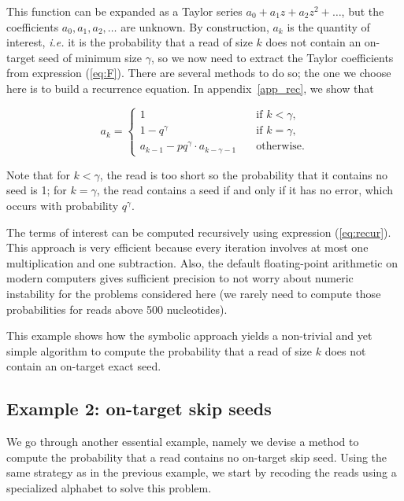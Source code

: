 \documentclass{article}
\begin{document}
This function can be expanded as a Taylor series $a_0 + a_1z + a_2z^2 +
\ldots$, but the coefficients $a_0, a_1, a_2, \ldots$ are unknown. By
construction, $a_k$ is the quantity of interest, \textit{i.e.} it is the
probability that a read of size $k$ does not contain an on-target seed of
minimum size $\gamma$, so we now need to extract the Taylor coefficients
from expression (\ref{eq:F}). There are several methods to do so; the one
we choose here is to build a recurrence equation. In
appendix~\ref{app_rec}, we show that

\begin{equation}
\label{eq:recur}
a_k = 
\begin{cases}
1            &\quad\text{if } k < \gamma, \\
1 -q^\gamma &\quad\text{if } k = \gamma, \\
a_{k-1} -pq^\gamma \cdot a_{k-\gamma-1} &\quad\text{otherwise.}
\end{cases}
\end{equation}

Note that for $k < \gamma$, the read is too short so the probability that
it contains no seed is 1; for $k = \gamma$, the read contains a seed if
and only if it has no error, which occurs with probability $q^\gamma$.

The terms of interest can be computed recursively using expression
(\ref{eq:recur}). This approach is very efficient because every iteration
involves at most one multiplication and one subtraction. Also, the default
floating-point arithmetic on modern computers gives sufficient precision
to not worry about numeric instability for the problems considered here
(we rarely need to compute those probabilities for reads above 500
nucleotides).

This example shows how the symbolic approach yields a non-trivial and yet
simple algorithm to compute the probability that a read of size $k$ does
not contain an on-target exact seed.


\subsection{Example 2: on-target skip seeds}
\label{sec:example_skip}

We go through another essential example, namely we devise a method to
compute the probability that a read contains no on-target skip seed. Using
the same strategy as in the previous example, we start by recoding the
reads using a specialized alphabet to solve this problem.
\end{document}
